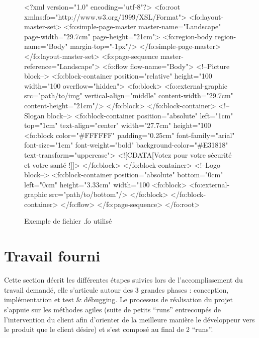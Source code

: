 \documentclass{article}
\begin{document}
\begin{sffamily}
\begin{figure}
	\begin{boxedverbatim}
<?xml version="1.0" encoding="utf-8"?>
  <fo:root xmlns:fo="http://www.w3.org/1999/XSL/Format">
    <fo:layout-master-set>
      <fo:simple-page-master master-name="Landscape" page-width="29.7cm" page-height="21cm">
        <fo:region-body region-name="Body" margin-top="-1px"/>
      </fo:simple-page-master>
    </fo:layout-master-set>
    <fo:page-sequence master-reference="Landscape">
      <fo:flow flow-name="Body">
        <!--Picture block-->
        <fo:block-container position="relative"
                            height="100%
                            width="100%
                            overflow="hidden">
          <fo:block>
            <fo:external-graphic src="path/to/img"
                                 vertical-align="middle"
                                 content-width="29.7cm"
                                 content-height="21cm"/>
          </fo:block>
        </fo:block-container>
        <!--Slogan block-->
        <fo:block-container position="absolute" left="1cm" top="1cm" text-align="center"
                            width="27.7cm" height="100%
          <fo:block color="#FFFFFF"
                    padding="0.25cm"
                    font-family="arial"
                    font-size="1cm"
                    font-weight="bold"
                    background-color="#E31818"
                    text-transform="uppercase">
            <![CDATA[Votez pour votre sécurité et votre santé !]]>
          </fo:block>
        </fo:block-container>
        <!--Logo block-->
        <fo:block-container position="absolute" bottom="0cm" left="0cm" height="3.33cm"
                            width="100%
          <fo:block>
            <fo:external-graphic src="path/to/bottom"/>
          </fo:block>
        </fo:block-container>
      </fo:flow>
    </fo:page-sequence>
  </fo:root>
	\end{boxedverbatim}
	\caption{Exemple de fichier .fo utilisé}
\end{figure}

\newpage

\section{Travail fourni}

Cette section décrit les différentes étapes suivies lors de l'accomplissement du travail demandé, elle s'articule autour des 3 grandes phases : conception, implémentation et 
test \& débugging. Le processus de réalisation du projet s'appuie sur les méthodes agiles (suite de petits ``runs'' entrecoupés de l'intervention du client afin d'orienter 
de la meilleure manière le développeur vers le produit que le client désire) et s'est composé au final de 2 ``runs''.


\end{sffamily}
\end{document}
